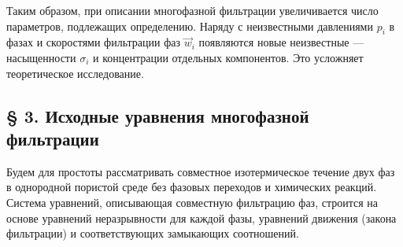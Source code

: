Таким образом, при описании многофазной фильтрации увеличивается число параметров, подлежащих определению. Наряду с неизвестными давлениями $p_i$ в фазах и скоростями фильтрации фаз $\vec w_i$ появляются новые неизвестные --- насыщенности $\sigma_i$ и концентрации отдельных компонентов. Это усложняет теоретическое исследование.

\subsection*{§ 3. Исходные уравнения многофазной фильтрации}
Будем для простоты рассматривать совместное изотермическое течение двух фаз в однородной пористой среде без фазовых переходов и химических реакций. Система уравнений, описывающая совместную фильтрацию фаз, строится на основе уравнений неразрывности для каждой фазы, уравнений движения (закона фильтрации) и соответствующих замыкающих соотношений.

